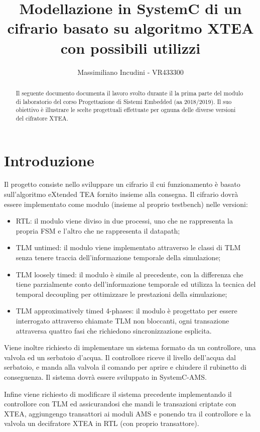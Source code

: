 \documentclass[]{IEEEtran}
\title{Modellazione in SystemC di un cifrario basato su algoritmo XTEA con possibili utilizzi}
\author{Massimiliano Incudini - VR433300}
\begin{document}
\maketitle

\begin{abstract}
    Il seguente documento documenta il lavoro svolto durante il la prima parte del modulo di laboratorio del corso Progettazione di Sistemi Embedded (aa 2018/2019). Il suo obiettivo è illustrare le scelte progettuali effettuate per ognuna delle diverse versioni del cifratore XTEA.
\end{abstract}

\section{Introduzione}

Il progetto consiste nello sviluppare un cifrario il cui funzionamento è basato sull'algoritmo eXtended TEA fornito insieme alla consegna. Il cifrario dovrà essere implementato come modulo (insieme al proprio testbench) nelle versioni:
\begin{itemize}
    \item RTL: il modulo viene diviso in due processi, uno che ne rappresenta la propria FSM e l'altro che ne rappresenta il datapath;
    \item TLM untimed: il modulo viene implementato attraverso le classi di TLM senza tenere traccia dell'informazione temporale della simulazione;
    \item TLM loosely timed: il modulo è simile al precedente, con la differenza che tiene parzialmente conto dell'informazione temporale ed utilizza la tecnica del temporal decoupling per ottimizzare le prestazioni della simulazione;
    \item TLM approximatively timed 4-phases: il modulo è progettato per essere interrogato attraverso chiamate TLM non bloccanti, ogni transazione attraversa quattro fasi che richiedono sincronizzazione esplicita.
\end{itemize}

Viene inoltre richiesto di implementare un sistema formato da un controllore, una valvola ed un serbatoio d'acqua. Il controllore riceve il livello dell'acqua dal serbatoio, e manda alla valvola il comando per aprire e chiudere il rubinetto di conseguenza. Il sistema dovrà essere sviluppato in SystemC-AMS.

Infine viene richiesto di modificare il sistema precedente implementando il controllore con TLM ed assicurandosi che mandi le transazioni criptate con XTEA, aggiungengo transattori ai moduli AMS e ponendo tra il controllore e la valvola un decifratore XTEA in RTL (con proprio transattore).





\end{document}
